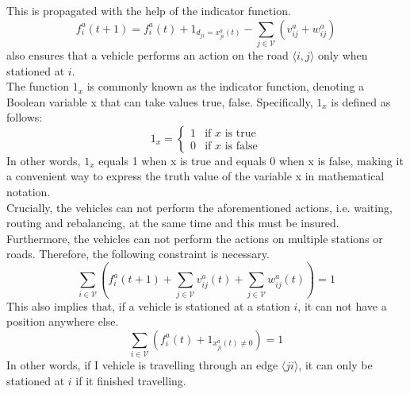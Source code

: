 This is propagated with the help of the indicator function. 
\begin{equation}
	f^a_i(t+1) =f^a_i(t) + 1_{d_{ji} = x^a_{ji}(t)} - \sum_{j\in\mathcal{V}}(v_{ij}^a + w_{ij}^a) %
	\label{eq:stationed_propagation_ind}
\end{equation}
 also ensures that a vehicle performs an action on the road $\langle i,j\rangle$ only when stationed at $i$.\\
The function $1_x$ is commonly known as the indicator function, denoting a Boolean variable x that can take values {true, false}. Specifically, $1_x$ is defined as follows:
\begin{equation}
	1_x = \begin{cases}
		1 & \text{if } x \text{ is true} \\
		0 & \text{if } x \text{ is false}
	\end{cases}
\end{equation}
In other words, $1_x$ equals 1 when x is true and equals 0 when x is false, making it a convenient way to express the truth value of the variable x in mathematical notation.\\
Crucially, the vehicles can not perform the aforementioned actions, i.e. waiting, routing and rebalancing, at the same time and this must be insured. Furthermore, the vehicles can not perform the actions on multiple stations or roads. Therefore, the following constraint is necessary. \\
\begin{equation}
	\sum_{i \in \mathcal{V}}(f^a_{i}(t+1)+\sum_{j \in \mathcal{V}}v^a_{ij}(t) + \sum_{j \in \mathcal{V}}w^a_{ij}(t)) = 1\label{eq:no_3_actions}
\end{equation}
This also implies that, if a vehicle is stationed at a station $i$, it can not have a position anywhere else. 
\begin{equation}
	\sum_{i \in \mathcal{V}}(f^a_{i}(t)+1_{ x^a_{ji}(t)\neq 0}) =1 \label{eq:position_station}
\end{equation}
In other words, if I vehicle is travelling through an edge $\langle ji\rangle$, it can only be stationed at $i$ if it finished travelling. \\
